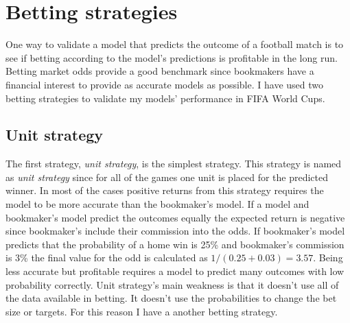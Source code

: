 \section{Betting strategies}
One way to validate a model that predicts the outcome of a football match is to see if betting according to the model's predictions is profitable in the long run. Betting market odds provide a good benchmark since bookmakers have a financial interest to provide as accurate models as possible. I have used two betting strategies to validate my models' performance in FIFA World Cups.

\subsection{Unit strategy}
The first strategy, \textit{unit strategy}, is the simplest strategy. This strategy is named as \textit{unit strategy} since for all of the games one unit is placed for the predicted winner. In most of the cases positive returns from this strategy requires the model to be more accurate than the bookmaker's model. If a model and bookmaker's model predict the outcomes equally the expected return is negative since bookmaker's include their commission into the odds. If bookmaker's model predicts that the probability of a home win is 25\% and bookmaker's commission is 3\% the final value for the odd is calculated as $1/(0.25+0.03) = 3.57$. Being less accurate but profitable requires a model to predict many outcomes with low probability correctly. Unit strategy's main weakness is that it doesn't use all of the data available in betting. It doesn't use the probabilities to change the bet size or targets. For this reason I have a another betting strategy.

